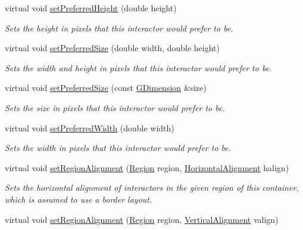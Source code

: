 \begin{DoxyCompactItemize}
virtual void \mbox{\hyperlink{classsgl_1_1GInteractor_a1ab987704fce32098706c6f00fb08218}{set\+Preferred\+Height}} (double height)
\begin{DoxyCompactList}\small\item\em Sets the height in pixels that this interactor would prefer to be. \end{DoxyCompactList}\item 
virtual void \mbox{\hyperlink{classsgl_1_1GInteractor_a042c5ae19430d765ef552371cae3632c}{set\+Preferred\+Size}} (double width, double height)
\begin{DoxyCompactList}\small\item\em Sets the width and height in pixels that this interactor would prefer to be. \end{DoxyCompactList}\item 
virtual void \mbox{\hyperlink{classsgl_1_1GInteractor_aa22d9be4bc0e078bb0ea69b0fc9d7c75}{set\+Preferred\+Size}} (const \mbox{\hyperlink{structsgl_1_1GDimension}{G\+Dimension}} \&size)
\begin{DoxyCompactList}\small\item\em Sets the size in pixels that this interactor would prefer to be. \end{DoxyCompactList}\item 
virtual void \mbox{\hyperlink{classsgl_1_1GInteractor_a3db429ab2fa52efd187eec0ed8cdd9f2}{set\+Preferred\+Width}} (double width)
\begin{DoxyCompactList}\small\item\em Sets the width in pixels that this interactor would prefer to be. \end{DoxyCompactList}\item 
virtual void \mbox{\hyperlink{classsgl_1_1GContainer_a96e9f5593c0193bbdc7ae99945b9cf5f}{set\+Region\+Alignment}} (\mbox{\hyperlink{classsgl_1_1GContainer_a81a01a86de31071a92e6cce0bab9bc4b}{Region}} region, \mbox{\hyperlink{namespacesgl_aa00e70829e72ff16addc4d9f06fe3bc5}{Horizontal\+Alignment}} halign)
\begin{DoxyCompactList}\small\item\em Sets the horizontal alignment of interactors in the given region of this container, which is assumed to use a border layout. \end{DoxyCompactList}\item 
virtual void \mbox{\hyperlink{classsgl_1_1GContainer_a926942899d029fc9921fe770ac2867bb}{set\+Region\+Alignment}} (\mbox{\hyperlink{classsgl_1_1GContainer_a81a01a86de31071a92e6cce0bab9bc4b}{Region}} region, \mbox{\hyperlink{namespacesgl_a9c2ed22cfbd21f13df24ea193b310aee}{Vertical\+Alignment}} valign)

\end{DoxyCompactItemize}
